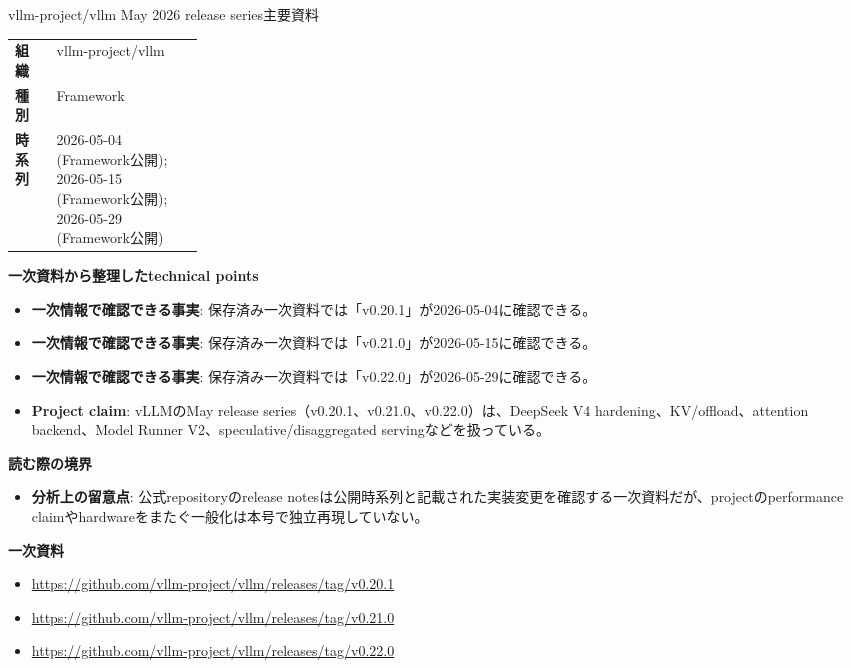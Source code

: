 \begin{technicalnote}{vllm-project/vllm May 2026 release series}{主要資料}
\begingroup
\begin{tabularx}{\linewidth}{@{}>{\bfseries}p{0.22\linewidth}X@{}}
組織 & vllm-project/vllm \\
種別 & Framework \\
時系列 & 2026-05-04 (Framework公開); 2026-05-15 (Framework公開); 2026-05-29 (Framework公開) \\
\end{tabularx}
\smallskip
{\bfseries 一次資料から整理したtechnical points}
\begin{itemize}[leftmargin=1.5em,itemsep=0.35em]
\item \textbf{一次情報で確認できる事実}: 保存済み一次資料では「v0.20.1」が2026-05-04に確認できる。
\item \textbf{一次情報で確認できる事実}: 保存済み一次資料では「v0.21.0」が2026-05-15に確認できる。
\item \textbf{一次情報で確認できる事実}: 保存済み一次資料では「v0.22.0」が2026-05-29に確認できる。
\item \textbf{Project claim}: vLLMのMay release series（v0.20.1、v0.21.0、v0.22.0）は、DeepSeek V4 hardening、KV/offload、attention backend、Model Runner V2、speculative/disaggregated servingなどを扱っている。
\end{itemize}
{\bfseries 読む際の境界}
\begin{itemize}[leftmargin=1.5em,itemsep=0.35em]
\item \textbf{分析上の留意点}: 公式repositoryのrelease notesは公開時系列と記載された実装変更を確認する一次資料だが、projectのperformance claimやhardwareをまたぐ一般化は本号で独立再現していない。
\end{itemize}
\begin{samepage}
{\bfseries 一次資料}
\begingroup\sloppy
\begin{itemize}[leftmargin=1.5em,itemsep=0.25em]
\item {\scriptsize\url{https://github.com/vllm-project/vllm/releases/tag/v0.20.1}}
\item {\scriptsize\url{https://github.com/vllm-project/vllm/releases/tag/v0.21.0}}
\item {\scriptsize\url{https://github.com/vllm-project/vllm/releases/tag/v0.22.0}}
\end{itemize}
\endgroup
\end{samepage}
\endgroup
\end{technicalnote}
\medskip

